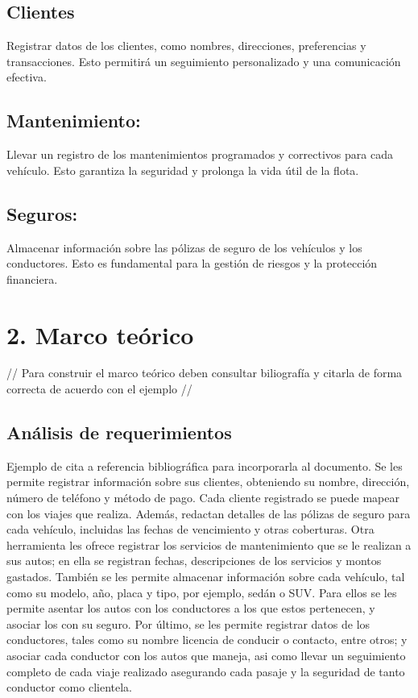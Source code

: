 \documentclass{article}
\begin{document}
   	 \subsection{Clientes} Registrar datos de los clientes, como nombres, direcciones, preferencias y transacciones. Esto permitirá un seguimiento personalizado y una comunicación efectiva.
   	
   	 \subsection{Mantenimiento:} Llevar un registro de los mantenimientos programados y correctivos para cada vehículo. Esto garantiza la seguridad y prolonga la vida útil de la flota.
   	
   	 \subsection{Seguros:} Almacenar información sobre las pólizas de seguro de los vehículos y los conductores. Esto es fundamental para la gestión de riesgos y la protección financiera. 
   	 
    \newpage



\section{2. Marco teórico}
// Para construir el marco teórico deben consultar biliografía y citarla de forma correcta de acuerdo con el ejemplo //

    \subsection{Análisis de requerimientos}
    Ejemplo de cita a referencia bibliográfica \cite{Grabowska2022} para incorporarla al documento.
    Se les permite registrar información sobre sus clientes, obteniendo su nombre, dirección, número de teléfono y método de pago. Cada cliente registrado se puede mapear con los viajes que realiza. Además, redactan detalles de las pólizas de seguro para cada vehículo, incluidas las fechas de vencimiento y otras coberturas. Otra herramienta les ofrece registrar los servicios de mantenimiento que se le realizan a sus autos; en ella se registran fechas, descripciones de los servicios y montos gastados. También se les permite almacenar información sobre cada vehículo, tal como su modelo, año, placa y tipo, por ejemplo, sedán o SUV. Para ellos se les permite asentar los autos con los conductores a los que estos pertenecen, y asociar los con su seguro. Por último, se les permite registrar datos de los conductores, tales como su nombre licencia de conducir o contacto, entre otros; y asociar cada conductor con los autos que maneja, asi como llevar un seguimiento completo de cada viaje realizado asegurando cada pasaje y la seguridad de tanto conductor como clientela.
    
\end{document}
